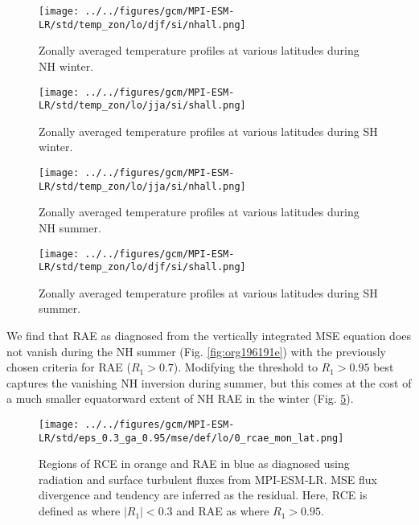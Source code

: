 \documentclass[11pt]{article}
\begin{document}
\begin{figure}[htbp]
\centering
\texttt{[image: ../../figures/gcm/MPI-ESM-LR/std/temp\_zon/lo/djf/si/nhall.png]}
\caption{\label{fig:org0e1059c}Zonally averaged temperature profiles at various latitudes during NH winter.}
\end{figure}

\begin{figure}[htbp]
\centering
\texttt{[image: ../../figures/gcm/MPI-ESM-LR/std/temp\_zon/lo/jja/si/shall.png]}
\caption{\label{fig:org28f944a}Zonally averaged temperature profiles at various latitudes during SH winter.}
\end{figure}

\begin{figure}[htbp]
\centering
\texttt{[image: ../../figures/gcm/MPI-ESM-LR/std/temp\_zon/lo/jja/si/nhall.png]}
\caption{\label{fig:org8e028a5}Zonally averaged temperature profiles at various latitudes during NH summer.}
\end{figure}

\begin{figure}[htbp]
\centering
\texttt{[image: ../../figures/gcm/MPI-ESM-LR/std/temp\_zon/lo/djf/si/shall.png]}
\caption{\label{fig:org660a9dd}Zonally averaged temperature profiles at various latitudes during SH summer.}
\end{figure}

We find that RAE as diagnosed from the vertically integrated MSE equation does not vanish during the NH summer (Fig. \ref{fig:org196191e}) with the previously chosen criteria for RAE (\(R_1>0.7\)). Modifying the threshold to \(R_1>0.95\) best captures the vanishing NH inversion during summer, but this comes at the cost of a much smaller equatorward extent of NH RAE in the winter (Fig. \ref{fig:org48b3b97}).

\begin{figure}[htbp]
\centering
\texttt{[image: ../../figures/gcm/MPI-ESM-LR/std/eps\_0.3\_ga\_0.95/mse/def/lo/0\_rcae\_mon\_lat.png]}
\caption{\label{fig:org48b3b97}Regions of RCE in orange and RAE in blue as diagnosed using radiation and surface turbulent fluxes from MPI-ESM-LR. MSE flux divergence and tendency are inferred as the residual. Here, RCE is defined as where \(|R_1| < 0.3\) and RAE as where \(R_1 > 0.95\).}
\end{figure}
\end{document}
